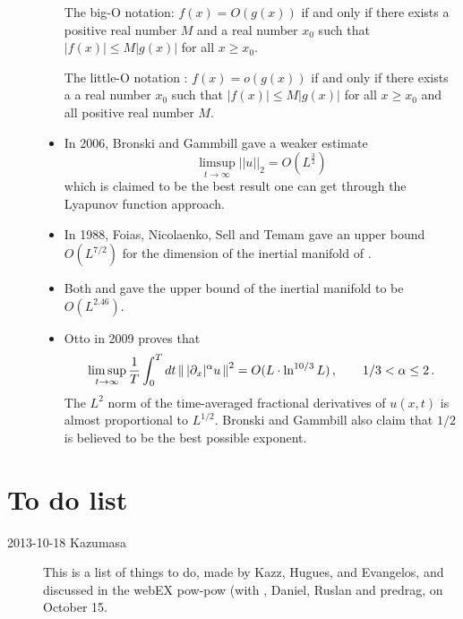 \begin{description}
\begin{itemize}
    The big-O notation: 
    $f(x) = O(g(x))$ if and only if there exists a positive real number $M$ and 
    a real number $x_0$ such that $|f(x)| \le M |g(x)|$ for all $x \ge x_0$.
    
    The little-O notation :
    $f(x) = o(g(x))$ if and only if there exists a  
    a real number $x_0$ such that $|f(x)| \le M |g(x)|$ for all $x \ge x_0$ and 
    all positive real number $M$.

  \item  
    In 2006, Bronski and Gammbill gave a weaker estimate 
    \[
      \limsup_{t\to\infty}|\!|u|\!|_2 = O(L^{\frac{3}{2}})
    \]
    which is claimed to be 
    the best result one can get through the Lyapunov function approach. 
    
  \item 
    In 1988, Foias, Nicolaenko, Sell and Temam gave an upper bound 
    $O(L^{7/2})$ for the dimension of the inertial manifold of \KSe.
  \item 
    Both  and  gave the upper bound of the
    inertial manifold to be $O(L^{2.46})$.
    
  \item Otto in 2009 proves that 
    \[
      \limsup_{t\to\infty} \frac{1}{T}\int_0^T dt \left\Arrowvert \, |\partial_x|^\alpha u \, \right\Arrowvert^2 
      = O(L\cdot\ln^{10/3} L)
      \,,\qquad 1/3 < \alpha \le 2 
      \,.
    \]
    The $L^2$ norm of the 
    time-averaged fractional derivatives of $u(x,t)$ is almost 
    proportional to $L^{1/2}$. Bronski and Gammbill
    also claim that $1/2$ is believed to be the best possible exponent.

  \end{itemize}


\end{description}


\section{To do list}
\label{sect:ToDo}

\begin{description}
\item[2013-10-18 Kazumasa]
  This is a list of things to do, made by Kazz, Hugues, and Evangelos,
  and discussed in the webEX pow-pow (with \XD, Daniel, Ruslan
  and predrag, on October 15.
\end{description}

